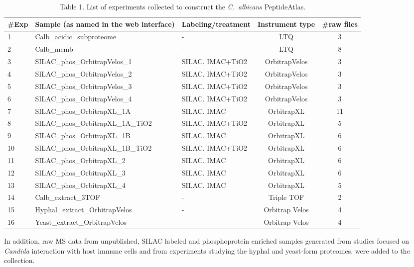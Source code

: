 \begin{table}[t]
\caption*{Table 1. List of experiments collected to construct the \textit{\mbox{C. albicans}} PeptideAtlas.}
\renewcommand{\arraystretch}{1.5}
\footnotesize
\centering
\begin{tabular}{l p{4cm} p{2cm} c c }
\hline
\#Exp & Sample \newline{} (as named in the web interface) & Labeling/treatment & Instrument type & \#raw files\\
\hline
1 & Calb\_acidic\_subproteome & - & LTQ & 3\\
2 & Calb\_memb & - & LTQ & 8\\
3 & SILAC\_phos\_OrbitrapVelos\_1 & SILAC. IMAC+TiO2 & OrbitrapVelos & 3\\
4 & SILAC\_phos\_OrbitrapVelos\_2 & SILAC. IMAC+TiO2 & OrbitrapVelos & 3\\
5 & SILAC\_phos\_OrbitrapVelos\_3 & SILAC. IMAC+TiO2 & OrbitrapVelos & 3\\
6 & SILAC\_phos\_OrbitrapVelos\_4 & SILAC. IMAC+TiO2 & OrbitrapVelos & 3\\
7 & SILAC\_phos\_OrbitrapXL\_1A & SILAC. IMAC & OrbitrapXL & 11\\
8 & SILAC\_phos\_OrbitrapXL\_1A\_TiO2 & SILAC. IMAC+TiO2 & OrbitrapXL & 5\\
9 & SILAC\_phos\_OrbitrapXL\_1B & SILAC. IMAC & OrbitrapXL & 6\\
10 & SILAC\_phos\_OrbitrapXL\_1B\_TiO2 & SILAC. IMAC+TiO2 & OrbitrapXL & 6\\
11 & SILAC\_phos\_OrbitrapXL\_2 & SILAC. IMAC & OrbitrapXL & 6\\
12 & SILAC\_phos\_OrbitrapXL\_3 & SILAC. IMAC & OrbitrapXL & 6\\
13 & SILAC\_phos\_OrbitrapXL\_4 & SILAC. IMAC & OrbitrapXL & 5\\
14 & Calb\_extract\_3TOF & - & Triple TOF & 2\\
15 & Hyphal\_extract\_OrbitrapVelos & - & Orbitrap Velos & 4\\
16 & Yeast\_extract\_OrbitrapVelos & - & Orbitrap Velos & 4\\
\end{tabular}
\end{table}


 

In addition, raw MS data from unpublished, SILAC labeled
and phosphoprotein enriched samples generated from studies
focused on \textit{Candida} interaction with host immune cells and from
experiments studying the hyphal and yeast-form proteomes,
were added to the collection.



